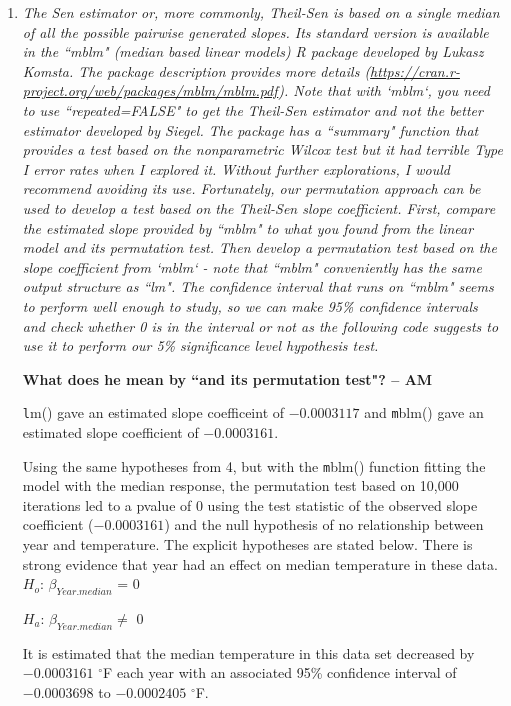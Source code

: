 \documentclass[11pt]{article}\usepackage[]{graphicx}\usepackage[]{color}
\begin{document}
\begin{enumerate}
\item%
{\it The Sen estimator or, more commonly, Theil-Sen is based on a single median of all the possible pairwise generated slopes. Its standard version is available in the ``mblm" (median based linear models) R package developed by Lukasz Komsta. The package description provides more details (\url{https://cran.r-project.org/web/packages/mblm/mblm.pdf}). Note that with `mblm`, you need to use ``repeated=FALSE" to get the Theil-Sen estimator and not the better estimator developed by Siegel. The package has a ``summary" function that provides a test based on the nonparametric Wilcox test but it had terrible Type I error rates when I explored it. Without further explorations, I would recommend avoiding its use. Fortunately, our permutation approach can be used to develop a test based on the Theil-Sen slope coefficient. First, compare the estimated slope provided by ``mblm" to what you found from the linear model and its permutation test. Then develop a permutation test based on the slope coefficient from `mblm` - note that ``mblm" conveniently has the same output structure as ``lm". The confidence interval that runs on ``mblm" seems to perform well enough to study, so we can make 95\% confidence intervals and check whether 0 is in the interval or not as the following code suggests to use it to perform our 5\% significance level hypothesis test.}

{\bf What does he mean by ``and its permutation test"? -- AM}




{\texttt lm()} gave an estimated slope coefficeint of \ensuremath{-0.0003117} and {\texttt mblm()} gave an estimated slope coefficient of \ensuremath{-0.0003161}.

Using the same hypotheses from 4, but with the {\texttt mblm()} function fitting the model with the median response, the permutation test based on 10,000 iterations led to a pvalue of 0 using the test statistic of the observed slope coefficient (\ensuremath{-0.0003161}) and the null hypothesis of no relationship between year and temperature. The explicit hypotheses are stated below. There is strong evidence that year had an effect on median temperature in these data. 
$H_{o}$: $\beta_{Year.median}$ = 0

$H_{a}$: $\beta_{Year.median} \neq$ 0

It is estimated that the median temperature in this data set decreased by \ensuremath{-0.0003161} $^\circ$F each year with an associated 95\% confidence interval of \ensuremath{-0.0003698} to \ensuremath{-0.0002405} $^\circ$F.


\end{enumerate}
\end{document}
